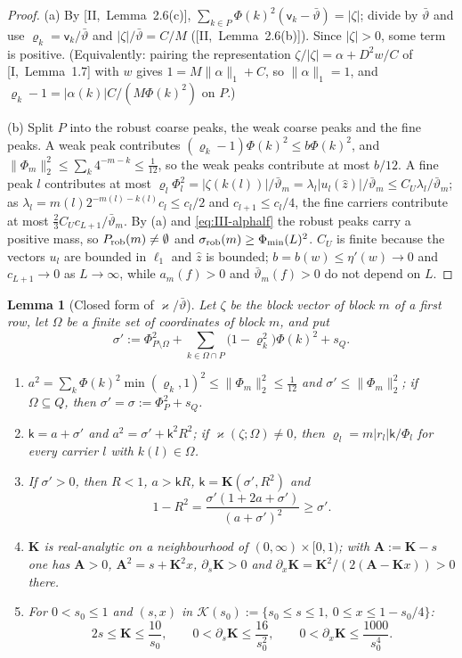 \documentclass[10pt]{amsart}
\newtheorem{lemma}[theorem]{Lemma}
\theoremstyle{definition}
\theoremstyle{remark}
\newcommand{\zh}{\hat z}
\begin{document}
\begin{proof}
(a) By [II,~Lemma~2.6(c)], $\sum_{k\in P}\Phi(k)^2(\mathsf v_k-\bar\vartheta)=
|\zeta|$; divide by $\bar\vartheta$ and use $\varrho_k=\mathsf v_k/\bar\vartheta$ and
$|\zeta|/\bar\vartheta=C/M$ ([II,~Lemma~2.6(b)]).  Since $|\zeta|>0$, some term is
positive.  (Equivalently: pairing the representation $\zeta/|\zeta|=\alpha+
D^2w/C$ of [I,~Lemma~1.7] with $w$ gives $1=M\|\alpha\|_1+C$, so $\|\alpha\|_1
=1$, and $\varrho_k-1=|\alpha(k)|C/(M\Phi(k)^2)$ on $P$.)

(b) Split $P$ into the robust coarse peaks, the weak coarse peaks and the
fine peaks.  A weak peak contributes $(\varrho_k-1)\Phi(k)^2\le b\Phi(k)^2$, and
$\|\Phi_m\|_2^2\le\sum_k4^{-m-k}\le\frac1{12}$, so the weak peaks contribute
at most $b/12$.  A fine peak $l$ contributes at most $\varrho_l\Phi_l^2=
|\zeta(k(l))|/\bar\vartheta_m=\lambda_l|u_l(\zh)|/\bar\vartheta_m\le C_U\lambda_l/
\bar\vartheta_m$; as $\lambda_l=m(l)2^{-m(l)-k(l)}c_l\le c_l/2$ and $c_{l+1}\le
c_l/4$, the fine carriers contribute at most $\frac23C_Uc_{L+1}/
\bar\vartheta_m$.  By (a) and \eqref{eq:III-alphalf} the robust peaks carry a
positive mass, so $P_{\rm rob}(m)\ne\emptyset$ and $\sigma_{\rm rob}(m)\ge
\Phi_{\min}(L)^2$.  $C_U$ is finite because the vectors $u_l$ are bounded in
$\ell_1$ and $\zh$ is bounded; $b=b(w)\le\eta'(w)\to0$ and $c_{L+1}\to0$ as
$L\to\infty$, while $a_m(f)>0$ and $\bar\vartheta_m(f)>0$ do not depend on $L$.
\end{proof}

\begin{lemma}[Closed form of $\varkappa/\bar\vartheta$]\label{lem:III-K}
Let $\zeta$ be the block vector of block $m$ of a first row, let $\Omega$ be a
finite set of coordinates of block $m$, and put
\[
 \sigma':=\Phi_{P\setminus\Omega}^2+\sum_{k\in\Omega\cap P}\big(1-\varrho_k^2\big)
 \Phi(k)^2+s_Q .
\]
\begin{enumerate}
\item[(a)] $a^2=\sum_k\Phi(k)^2\min(\varrho_k,1)^2\le\|\Phi_m\|_2^2\le\frac1{12}$
and $\sigma'\le\|\Phi_m\|_2^2$; if $\Omega\subseteq Q$, then $\sigma'=\sigma:=
\Phi_P^2+s_Q$.
\item[(b)] $\mathsf k=a+\sigma'$ and $a^2=\sigma'+\mathsf k^2R^2$; if
$\varkappa(\zeta;\Omega)\ne0$, then $\varrho_l=m|r_l|\mathsf k/\Phi_l$ for every
carrier $l$ with $k(l)\in\Omega$.
\item[(c)] If $\sigma'>0$, then $R<1$, $a>\mathsf kR$, $\mathsf k=\mathbf
K(\sigma',R^2)$ and
\[
 1-R^2=\frac{\sigma'(1+2a+\sigma')}{(a+\sigma')^2}\ge\sigma' .
\]
\item[(d)] $\mathbf K$ is real-analytic on a neighbourhood of $(0,\infty)\times
[0,1)$; with $\mathbf A:=\mathbf K-s$ one has $\mathbf A>0$, $\mathbf A^2=s+
\mathbf K^2x$, $\partial_s\mathbf K>0$ and $\partial_x\mathbf K=\mathbf K^2/
(2(\mathbf A-\mathbf Kx))>0$ there.
\item[(e)] For $0<s_0\le1$ and $(s,x)$ in $\mathcal K(s_0):=\{s_0\le s\le1,\
0\le x\le1-s_0/4\}$:
\[
 2s\le\mathbf K\le\frac{10}{s_0},\qquad 0<\partial_s\mathbf K\le\frac{16}{s_0^2},
 \qquad0<\partial_x\mathbf K\le\frac{1000}{s_0^4} .
\]
\end{enumerate}
\end{lemma}
\end{document}
